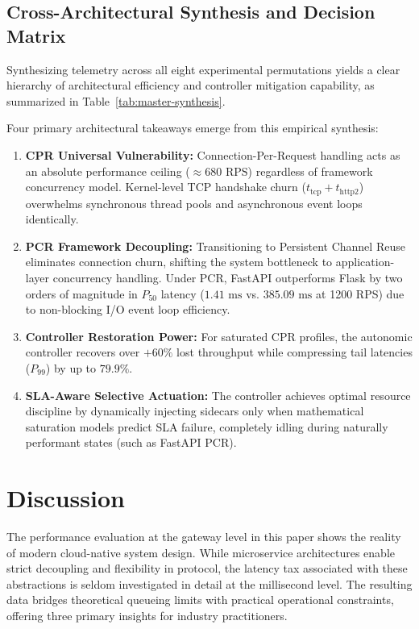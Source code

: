 \documentclass{ieeeaccess}
\begin{document}
\subsection{Cross-Architectural Synthesis and Decision Matrix}
\label{sec5.5_synthesis}

Synthesizing telemetry across all eight experimental permutations yields a clear hierarchy of architectural efficiency and controller mitigation capability, as summarized in Table~\ref{tab:master-synthesis}.

Four primary architectural takeaways emerge from this empirical synthesis:
\begin{enumerate}
	\item \textbf{CPR Universal Vulnerability:} Connection-Per-Request handling acts as an absolute performance ceiling ($\approx 680\text{ RPS}$) regardless of framework concurrency model. Kernel-level TCP handshake churn ($t_{\text{tcp}} + t_{\text{http2}}$) overwhelms synchronous thread pools and asynchronous event loops identically.
	\item \textbf{PCR Framework Decoupling:} Transitioning to Persistent Channel Reuse eliminates connection churn, shifting the system bottleneck to application-layer concurrency handling. Under PCR, FastAPI outperforms Flask by two orders of magnitude in $P_{50}$ latency ($1.41\text{ ms}$ vs. $385.09\text{ ms}$ at 1200 RPS) due to non-blocking I/O event loop efficiency.
	\item \textbf{Controller Restoration Power:} For saturated CPR profiles, the autonomic controller recovers over $+60\%$ lost throughput while compressing tail latencies ($P_{99}$) by up to $79.9\%$.
	\item \textbf{SLA-Aware Selective Actuation:} The controller achieves optimal resource discipline by dynamically injecting sidecars only when mathematical saturation models predict SLA failure, completely idling during naturally performant states (such as FastAPI PCR).
\end{enumerate}




\section{Discussion}
\label{sec:discuss}

The performance evaluation at the gateway level in this paper shows the reality of modern cloud-native system design. While microservice architectures enable strict decoupling and flexibility in protocol, the latency tax associated with these abstractions is seldom investigated in detail at the millisecond level. The resulting data bridges theoretical queueing limits with practical operational constraints, offering three primary insights for industry practitioners.
\end{document}
